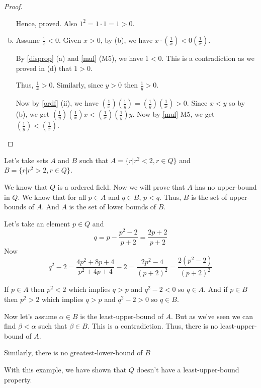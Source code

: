 \begin{proof}
\begin{enumerate}[a)]
        Hence, proved. Also $1^2 = 1 \cdot 1 = 1 > 0$.
        
        \item Assume $\frac{1}{x} < 0$. Given $x > 0$, by (b), 
         we have $x \cdot \left( \frac{1}{x} \right) < 0 \left( \frac{1}{x} \right)$.
    
        By \ref{disprop} (a) and \ref{mul} (M5), we have $1 < 0$. 
        This is a contradiction as we proved in (d) that $1 > 0$.

        Thus, $\frac{1}{x} > 0$. Similarly, since $y > 0$ then $\frac{1}{y} > 0$.

        Now by \ref{ordf} (ii), we have $( \frac{1}{x} ) ( \frac{1}{y} ) 
            = ( \frac{1}{y} )( \frac{1}{x} ) > 0$.
        Since $x < y$ so by (b), we get $(\frac{1}{y}) (\frac{1}{x}) x < (\frac{1}{x}) (\frac{1}{y}) y $.
        Now by \ref{mul} M5, we get $( \frac{1}{y} ) < ( \frac{1}{x} )$.
    \end{enumerate}
\end{proof}

\begin{exmp}
    Let's take sets $A$ and $B$ such that $A = \{ r | r^2 < 2, r \in Q \}$
    and $B = \{ r | r^2 > 2, r \in Q \}$.

    We know that $Q$ is a ordered field. Now we will prove that $A$ has no upper-bound in $Q$.
    We know that for all $p \in A$ and  $q \in B$, $p < q$. Thus, $B$ is the set of upper-bounds of $A$.
    And $A$ is the set of lower bounds of $B$.

    Let's take an element $p \in Q$ and $$ q = p - \frac{p^2 - 2}{p + 2} = \frac{2p + 2}{p + 2} $$
    Now $$ q^2 - 2 = \frac{4p^2 + 8p + 4}{p^2 + 4p + 4} - 2 = \frac{2p^2 - 4}{(p+2)^2} = \frac{2(p^2 - 2)}{(p+2)^2} $$

    If $p \in A$ then $p^2 < 2$ which implies $q > p$ and $q^2 - 2 < 0$ so $q \in A$.
    And if $p \in B$ then $p^2 > 2$ which implies $q > p$ and $q^2 - 2 > 0$ so $q \in B$.

    Now let's assume $\alpha \in B$ is the least-upper-bound of $A$.
    But as we've seen we can find $\beta < \alpha$ such that $\beta \in B$.
    This is a contradiction. Thus, there is no least-upper-bound of $A$.
    
    Similarly, there is no greatest-lower-bound of $B$

\end{exmp}

With this example, we have shown that $Q$ doesn't have a least-upper-bound property.


